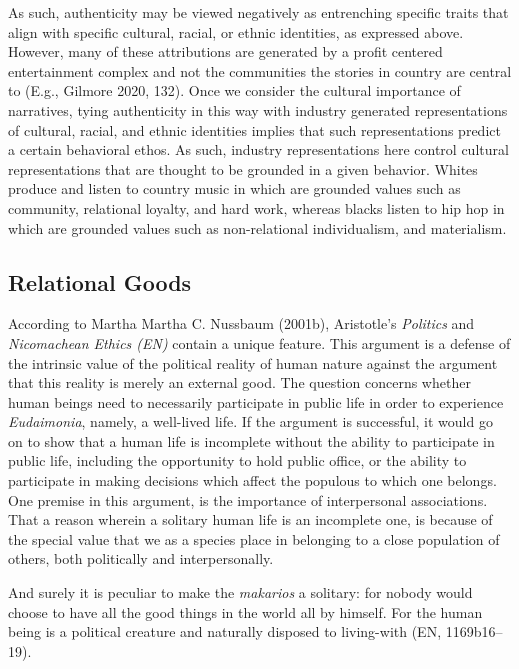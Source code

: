 \documentclass[
  letterpaper,
  DIV=11,
  numbers=noendperiod]{scrartcl}
\theoremstyle{remark}
\begin{document}
As such, authenticity may be viewed negatively as entrenching specific
traits that align with specific cultural, racial, or ethnic identities,
as expressed above. However, many of these attributions are generated by
a profit centered entertainment complex and not the communities the
stories in country are central to (E.g., Gilmore 2020, 132). Once we
consider the cultural importance of narratives, tying authenticity in
this way with industry generated representations of cultural, racial,
and ethnic identities implies that such representations predict a
certain behavioral ethos. As such, industry representations here control
cultural representations that are thought to be grounded in a given
behavior. Whites produce and listen to country music in which are
grounded values such as community, relational loyalty, and hard work,
whereas blacks listen to hip hop in which are grounded values such as
non-relational individualism, and materialism.

\subsection{Relational Goods}\label{relational-goods}

According to Martha Martha C. Nussbaum (2001b), Aristotle's
\emph{Politics} and \emph{Nicomachean Ethics (EN)} contain a unique
feature. This argument is a defense of the intrinsic value of the
political reality of human nature against the argument that this reality
is merely an external good. The question concerns whether human beings
need to necessarily participate in public life in order to experience
\emph{Eudaimonia}, namely, a well-lived life. If the argument is
successful, it would go on to show that a human life is incomplete
without the ability to participate in public life, including the
opportunity to hold public office, or the ability to participate in
making decisions which affect the populous to which one belongs. One
premise in this argument, is the importance of interpersonal
associations. That a reason wherein a solitary human life is an
incomplete one, is because of the special value that we as a species
place in belonging to a close population of others, both politically and
interpersonally.

And surely it is peculiar to make the \emph{makarios} a solitary: for
nobody would choose to have all the good things in the world all by
himself. For the human being is a political creature and naturally
disposed to living-with (EN, 1169b16--19).
\end{document}
